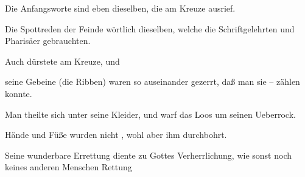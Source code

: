 \begin{aufzb}
\item Die Anfangsworte sind eben dieselben, die  am Kreuze ausrief.
\item Die Spottreden der Feinde wörtlich dieselben, welche die Schriftgelehrten und Pharisäer gebrauchten.
\item Auch  dürstete am Kreuze, und~
\item seine Gebeine (die Ribben) waren so auseinander gezerrt, daß man sie -- zählen konnte.
\item Man theilte sich unter seine Kleider, und warf das Loos um seinen Ueberrock.
\item Hände und Füße wurden nicht , wohl aber ihm durchbohrt.
\item Seine wunderbare Errettung diente zu Gottes Verherrlichung, wie sonst noch keines anderen Menschen Rettung \usw\
\end{aufzb}

